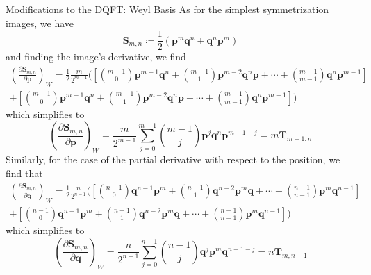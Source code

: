 \documentclass[aspectratio=169]{beamer}
\begin{document}
\begin{frame}[allowframebreaks]{Modifications to the DQFT: Weyl Basis}
		As for the simplest symmetrization images, we have
		\begin{equation}
			\textbf{S}_{m,n}\coloneqq\frac{1}{2}(\textbf{p}^m\textbf{q}^n+\textbf{q}^n\textbf{p}^m)
		\end{equation}
		and finding the image's derivative, we find
		\begin{multline}
			\left(\frac{\partial\textbf{S}_{m,n}}{\partial\textbf{p}}\right)_W=\frac{1}{2}\frac{m}{2^{m-1}}\biggl(\left[\binom{m-1}{0}\textbf{p}^{m-1}\textbf{q}^n+\binom{m-1}{1}\textbf{p}^{m-2}\textbf{q}^n\textbf{p}+\cdots+\binom{m-1}{m-1}\textbf{q}^n\textbf{p}^{m-1}\right]\\+\left[\binom{m-1}{0}\textbf{p}^{m-1}\textbf{q}^n+\binom{m-1}{1}\textbf{p}^{m-2}\textbf{q}^n\textbf{p}+\cdots+\binom{m-1}{m-1}\textbf{q}^n\textbf{p}^{m-1}\right]\biggr)
		\end{multline}
		which simplifies to
		\begin{equation}
			\left(\frac{\partial\textbf{S}_{m,n}}{\partial\textbf{p}}\right)_W=\frac{m}{2^{m-1}}\sum_{j=0}^{m-1}\binom{m-1}{j}\textbf{p}^j\textbf{q}^n\textbf{p}^{m-1-j}=m\textbf{T}_{m-1,n}
		\end{equation}
		Similarly, for the case of the partial derivative with respect to the position, we find that
		\begin{multline}
			\left(\frac{\partial\textbf{S}_{m,n}}{\partial\textbf{q}}\right)_W=\frac{1}{2}\frac{n}{2^{n-1}}\biggl(\left[\binom{n-1}{0}\textbf{q}^{n-1}\textbf{p}^m+\binom{n-1}{1}\textbf{q}^{n-2}\textbf{p}^m\textbf{q}+\cdots+\binom{n-1}{n-1}\textbf{p}^m\textbf{q}^{n-1}\right]\\+\left[\binom{n-1}{0}\textbf{q}^{n-1}\textbf{p}^m+\binom{n-1}{1}\textbf{q}^{n-2}\textbf{p}^m\textbf{q}+\cdots+\binom{n-1}{n-1}\textbf{p}^m\textbf{q}^{n-1}\right]\biggr)
		\end{multline}
		which simplifies to
		\begin{equation}
			\left(\frac{\partial\textbf{S}_{m,n}}{\partial\textbf{q}}\right)_W=\frac{n}{2^{n-1}}\sum_{j=0}^{n-1}\binom{n-1}{j}\textbf{q}^j\textbf{p}^m\textbf{q}^{n-1-j}=n\textbf{T}_{m,n-1}
		\end{equation}
		

\end{frame}
\end{document}
